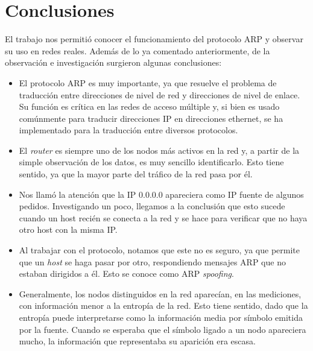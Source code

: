 \documentclass{article}
\begin{document}

\section{Conclusiones}
El trabajo nos permitió conocer el funcionamiento del protocolo ARP y observar
su uso en redes reales. Además de lo ya comentado anteriormente, de la
observación e investigación surgieron algunas conclusiones:

\begin{itemize}
    \item El protocolo ARP es muy importante, ya que resuelve el problema de
        traducción entre direcciones de nivel de red y direcciones de nivel de
        enlace. Su función es crítica en las redes de acceso múltiple y, si
        bien es usado comúnmente para traducir direcciones IP en direcciones
        ethernet, se ha implementado para la traducción entre diversos
        protocolos.
    \item El \emph{router} es siempre uno de los nodos más activos en la red
        y, a partir de la simple observación de los datos, es muy sencillo
        identificarlo. Esto tiene sentido, ya que la mayor parte del tráfico
        de la red pasa por él.
    \item Nos llamó la atención que la IP 0.0.0.0 apareciera como IP fuente de
        algunos pedidos. Investigando un poco, llegamos a la conclusión que
        esto sucede cuando un host recién se conecta a la red y se hace para
        verificar que no haya otro host con la misma IP.
    \item Al trabajar con el protocolo, notamos que este no es seguro, ya que
        permite que un \emph{host} se haga pasar por otro, respondiendo
        mensajes ARP que no estaban dirigidos a él. Esto se conoce como ARP
        \emph{spoofing}.
    \item Generalmente, los nodos distinguidos en la red aparecían, en las
        mediciones, con información menor a la entropía de la red. Esto tiene
        sentido, dado que la entropía puede interpretarse como la información
        media por símbolo emitida por la fuente. Cuando se esperaba que el
        símbolo ligado a un nodo apareciera mucho, la información que
        representaba su aparición era escasa. 
\end{itemize}
\end{document}
